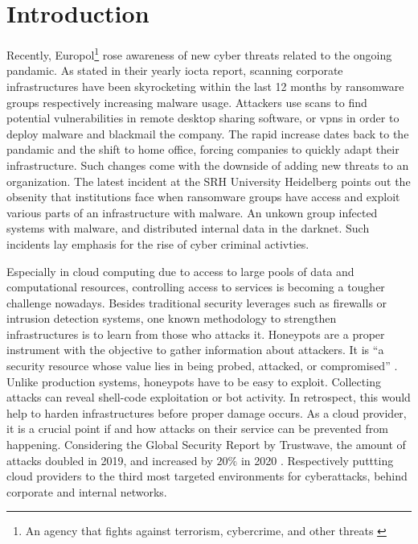 \chapter{Introduction}

Recently, Europol\footnote{An agency that fights against terrorism, cybercrime, and other threats \cite{europol2021}} rose awareness of new cyber threats related to the ongoing pandamic.
As stated in their yearly \ac{iocta} report, scanning corporate infrastructures have been skyrocketing within the last 12 months by ransomware groups respectively increasing malware usage.
Attackers use scans to find potential vulnerabilities in remote desktop sharing software, or \acp{vpn} in order to deploy malware and blackmail the company. \cite{iocta2020}
The rapid increase dates back to the pandamic and the shift to home office, forcing companies to quickly adapt their infrastructure.
Such changes come with the downside of adding new threats to an organization.
The latest incident at the SRH University Heidelberg points out the obsenity that institutions face when ransomware groups have access and exploit various parts of an infrastructure with malware.
An unkown group infected systems with malware, and distributed internal data in the darknet.
Such incidents lay emphasis for the rise of cyber criminal activties.

Especially in cloud computing due to access to large pools of data and computational resources, controlling access to services is becoming a tougher challenge nowadays.
Besides traditional security leverages such as firewalls or intrusion detection systems, one known methodology to strengthen infrastructures is to learn from those who attacks it.
Honeypots are a proper instrument with the objective to gather information about attackers.
It is \enquote{a security resource whose value lies in being probed, attacked, or compromised} \cite{Spitzner2003}.
Unlike production systems, honeypots have to be easy to exploit. 
Collecting attacks can reveal shell-code exploitation or bot activity.
In retrospect, this would help to harden infrastructures before proper damage occurs.
As a cloud provider, it is a crucial point if and how attacks on their service can be prevented from happening.
Considering the Global Security Report by Trustwave, the amount of attacks doubled in 2019, and increased by $20\%$ in 2020 \cite{fahim2020}.
Respectively puttting cloud providers to the third most targeted environments for cyberattacks, behind corporate and internal networks.

